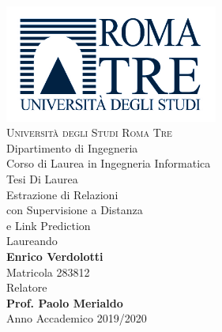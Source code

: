 \begin{titlepage}
\centering
{\includegraphics[width=7cm]{images/Logo_Roma_Tre.jpg}}\\
\vspace{0.2cm}
{\scshape \LARGE Università degli Studi Roma Tre}\\
\vspace{0.3cm}
{\Large Dipartimento di Ingegneria}\\
\vspace{-0.1cm}
{\Large Corso di Laurea in Ingegneria Informatica}\\
\vfill
{\LARGE Tesi Di Laurea}\\
\vfill
{\Huge Estrazione di Relazioni}\\
\vspace{0.3cm}
{\Huge con Supervisione a Distanza}\\
\vspace{0.3cm}
{\Huge e Link Prediction}\\
\vfill
{\large Laureando}\\
{\large \textbf{Enrico Verdolotti}}\\
{\large Matricola 283812}\\
\vfill
{Relatore}\\
{\large \textbf{Prof. Paolo Merialdo}}\\
\vfill
{\large Anno Accademico 2019/2020}

\end{titlepage}